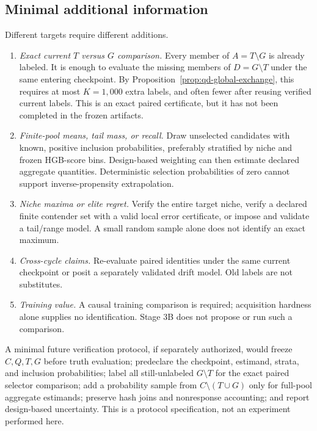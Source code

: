 \subsection{Minimal additional information}

Different targets require different additions.
\begin{enumerate}
  \item \emph{Exact current $T$ versus $G$ comparison.}  Every member of
  $A=T\setminus G$ is already labeled.  It is enough to evaluate the missing
  members of $D=G\setminus T$ under the same entering checkpoint.  By
  Proposition~\ref{prop:qd-global-exchange}, this requires at most $K=1,000$
  extra labels, and often fewer after reusing verified current labels.  This
  is an exact paired certificate, but it has not been completed in the frozen
  artifacts.
  \item \emph{Finite-pool means, tail mass, or recall.}  Draw unselected
  candidates with known, positive inclusion probabilities, preferably
  stratified by niche and frozen HGB-score bins.  Design-based weighting can
  then estimate declared aggregate quantities.  Deterministic selection
  probabilities of zero cannot support inverse-propensity extrapolation.
  \item \emph{Niche maxima or elite regret.}  Verify the entire target niche,
  verify a declared finite contender set with a valid local error certificate,
  or impose and validate a tail/range model.  A small random sample alone does
  not identify an exact maximum.
  \item \emph{Cross-cycle claims.}  Re-evaluate paired identities under the
  same current checkpoint or posit a separately validated drift model.  Old
  labels are not substitutes.
  \item \emph{Training value.}  A causal training comparison is required;
  acquisition hardness alone supplies no identification.  Stage 3B does not
  propose or run such a comparison.
\end{enumerate}

A minimal future verification protocol, if separately authorized, would
freeze $C,Q,T,G$ before truth evaluation; predeclare the checkpoint, estimand,
strata, and inclusion probabilities; label all still-unlabeled $G\setminus T$
for the exact paired selector comparison; add a probability sample from
$C\setminus(T\cup G)$ only for full-pool aggregate estimands; preserve hash
joins and nonresponse accounting; and report design-based uncertainty.
This is a protocol specification, not an experiment performed here.

